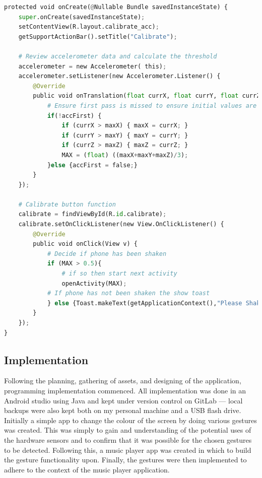 \documentclass{l4proj}
\begin{document}
\begin{lstlisting}[language=python, float, caption={Java Code used to implement the Calibration stage on opening the application. Showing how the shake gesture threshold is calculated and how this step is enforced.}, label=lst:Calibrator]
protected void onCreate(@Nullable Bundle savedInstanceState) {
    super.onCreate(savedInstanceState);
    setContentView(R.layout.calibrate_acc);
    getSupportActionBar().setTitle("Calibrate");

    # Review accelerometer data and calculate the threshold
    accelerometer = new Accelerometer( this);
    accelerometer.setListener(new Accelerometer.Listener() {
        @Override
        public void onTranslation(float currX, float currY, float currZ) {
            # Ensure first pass is missed to ensure initial values are not compared
            if(!accFirst) {
                if (currX > maxX) { maxX = currX; }
                if (currY > maxY) { maxY = currY; }
                if (currZ > maxZ) { maxZ = currZ; }
                MAX = (float) ((maxX+maxY+maxZ)/3);
            }else {accFirst = false;}
        }
    });

    # Calibrate button function
    calibrate = findViewById(R.id.calibrate);
    calibrate.setOnClickListener(new View.OnClickListener() {
        @Override
        public void onClick(View v) {
            # Decide if phone has been shaken
            if (MAX > 0.5){
                # if so then start next activity
                openActivity(MAX);
            # If phone has not been shaken the show toast 
            } else {Toast.makeText(getApplicationContext(),"Please Shake",Toast.LENGTH_SHORT).show();}
        }
    });
}
\end{lstlisting}

\subsection{Implementation}

Following the planning, gathering of assets, and designing of the application, programming implementation commenced. All implementation was done in an Android studio using Java and kept under version control on GitLab --- local backups were also kept both on my personal machine and a USB flash drive. Initially a simple app to change the colour of the screen by doing various gestures was created. This was simply to gain and understanding of the potential uses of the hardware sensors and to confirm that it was possible for the chosen gestures to be detected. Following this, a music player app was created in which to build the gesture functionality upon. Finally, the gestures were then implemented to adhere to the context of the music player application.
\end{document}
